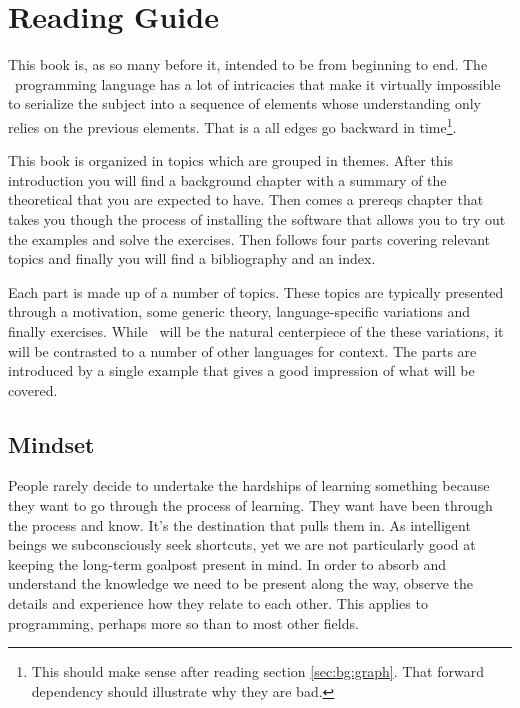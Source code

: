 \section{Reading Guide}

This book is, as so many before it, intended to be  from beginning to end. The \csharp\ programming language has a lot of intricacies that make it virtually impossible to serialize the subject into a sequence of elements whose understanding only relies on the previous elements. That is a  all edges go backward in time\footnote{This should make sense after reading section \ref{sec:bg:graph}. That forward dependency should illustrate why they are bad.}.

This book is organized in topics which are grouped in themes. After this introduction you will find a background chapter with a summary of the theoretical that you are expected to have. Then comes a prereqs chapter that takes you though the process of installing the software that allows you to try out the examples and solve the exercises. Then follows four parts covering relevant topics and finally you will find a bibliography and an index.

Each part is made up of a number of topics. These topics are typically presented through a motivation, some generic theory, language-specific variations and finally exercises. While \csharp\ will be the natural centerpiece of the these variations, it will be contrasted to a number of other languages for context. The parts are introduced by a single example that gives a good impression of what will be covered.

\subsection{Mindset}

\begin{inspiration}{\cite{selfrel}}
\end{inspiration}

People rarely decide to undertake the hardships of learning something because they want to go through the process of learning. They want have been through the process and know. It's the destination that pulls them in. As intelligent beings we subconsciously seek shortcuts, yet we are not particularly good at keeping the long-term goalpost present in mind. In order to absorb and understand the knowledge we need to be present along the way, observe the details and experience how they relate to each other. This applies to programming, perhaps more so than to most other fields.

